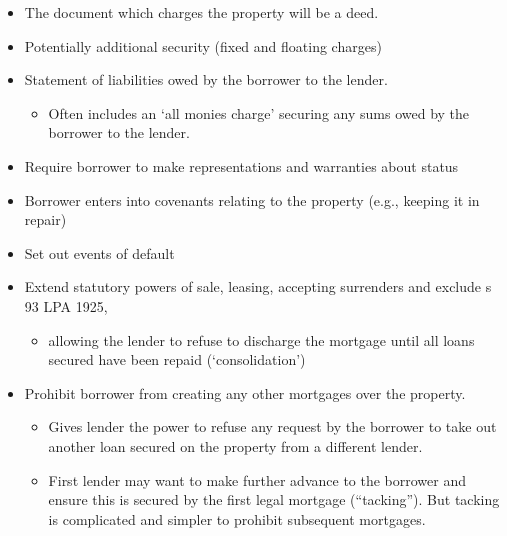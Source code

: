 \documentclass[
]{article}
\providecommand{\tightlist}{%
  \setlength{\itemsep}{0pt}\setlength{\parskip}{0pt}}
\begin{document}
\begin{itemize}
\tightlist
\item
  The document which charges the property will be a deed.
\item
  Potentially additional security (fixed and floating charges)
\item
  Statement of liabilities owed by the borrower to the lender.

  \begin{itemize}
  \tightlist
  \item
    Often includes an `all monies charge' securing any sums owed by the
    borrower to the lender.
  \end{itemize}
\item
  Require borrower to make representations and warranties about status
\item
  Borrower enters into covenants relating to the property (e.g., keeping
  it in repair)
\item
  Set out events of default
\item
  Extend statutory powers of sale, leasing, accepting surrenders and
  exclude s 93 LPA 1925,

  \begin{itemize}
  \tightlist
  \item
    allowing the lender to refuse to discharge the mortgage until all
    loans secured have been repaid (`consolidation')
  \end{itemize}
\item
  Prohibit borrower from creating any other mortgages over the property.

  \begin{itemize}
  \tightlist
  \item
    Gives lender the power to refuse any request by the borrower to take
    out another loan secured on the property from a different lender.
  \item
    First lender may want to make further advance to the borrower and
    ensure this is secured by the first legal mortgage (``tacking'').
    But tacking is complicated and simpler to prohibit subsequent
    mortgages.
  \end{itemize}
\end{itemize}
\end{document}
